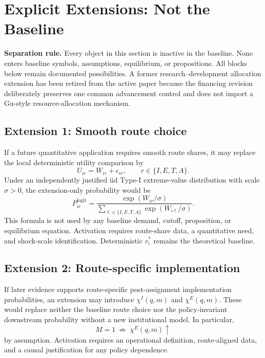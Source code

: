 \section{Explicit Extensions: Not the Baseline}
\label{sec:p11-extensions}

\textbf{Separation rule.} Every object in this section is inactive in the
baseline. None enters baseline symbols, assumptions, equilibrium, or
propositions. All blocks below remain documented possibilities. A former
research--development allocation extension has been retired from the active
paper because the financing revision deliberately preserves one common
advancement control and does not import a Gu-style resource-allocation
mechanism.

\subsection{Extension 1: Smooth route choice}
\label{subsec:p11-smooth-choice}

If a future quantitative application requires smooth route shares, it may
replace the local deterministic utility comparison by
\[
  U_{ir}=W_{ir}+\epsilon_{ir},
  \qquad r\in\{I,E,T,A\}.
\]
Under an independently justified iid Type-I extreme-value distribution with
scale \(\sigma>0\), the extension-only probability would be
\begin{equation}
  P_{ir}^{\mathrm{logit}}
  =
  \frac{\exp(W_{ir}/\sigma)}
  {\sum_{\ell\in\{I,E,T,A\}}\exp(W_{i\ell}/\sigma)}.
  \label{eq:p11-logit-extension}
\end{equation}
This formula is not used by any baseline demand, cutoff, proposition, or
equilibrium equation. Activation requires route-share data, a quantitative
need, and shock-scale identification. Deterministic
\(r_i^*\) remains the theoretical baseline.

\subsection{Extension 2: Route-specific implementation}
\label{subsec:p11-route-realization}

If later evidence supports route-specific post-assignment implementation
probabilities, an extension may introduce \(\chi^I(q,m)\) and
\(\chi^E(q,m)\). These would replace neither the baseline route choice nor the
policy-invariant downstream probability without a new institutional model.
In particular,
\[
  M=1
  \ \not\Rightarrow\
  \chi^E(q,m)\uparrow
\]
by assumption. Activation requires an operational definition, route-aligned
data, and a causal justification for any policy dependence.

